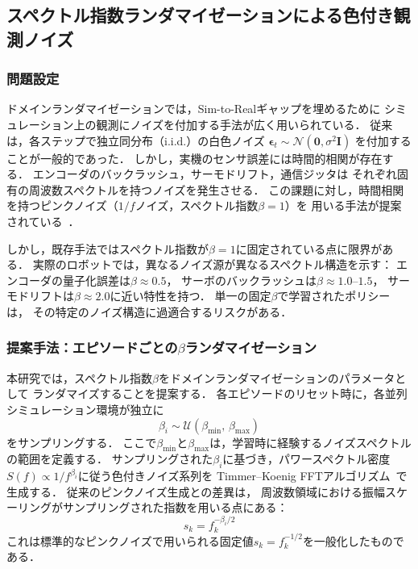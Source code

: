 %

\subsection{スペクトル指数ランダマイゼーションによる色付き観測ノイズ}
\label{sec:colored_obs_noise}

\subsubsection{問題設定}

ドメインランダマイゼーションでは，Sim-to-Realギャップを埋めるために
シミュレーション上の観測にノイズを付加する手法が広く用いられている．
従来は，各ステップで独立同分布（i.i.d.）の白色ノイズ
$\boldsymbol{\epsilon}_t \sim \mathcal{N}(\boldsymbol{0}, \sigma^2 \boldsymbol{I})$
を付加することが一般的であった．
しかし，実機のセンサ誤差には時間的相関が存在する．
エンコーダのバックラッシュ，サーモドリフト，通信ジッタは
それぞれ固有の周波数スペクトルを持つノイズを発生させる．
この課題に対し，時間相関を持つピンクノイズ（$1/f$ノイズ，スペクトル指数$\beta=1$）を
用いる手法が提案されている~\cite{eberhard2023pink}．

しかし，既存手法ではスペクトル指数が$\beta = 1$に固定されている点に限界がある．
実際のロボットでは，異なるノイズ源が異なるスペクトル構造を示す：
エンコーダの量子化誤差は$\beta \approx 0.5$，
サーボのバックラッシュは$\beta \approx 1.0$--$1.5$，
サーモドリフトは$\beta \approx 2.0$に近い特性を持つ．
単一の固定$\beta$で学習されたポリシーは，
その特定のノイズ構造に過適合するリスクがある．

\subsubsection{提案手法：エピソードごとの$\beta$ランダマイゼーション}

本研究では，スペクトル指数$\beta$をドメインランダマイゼーションのパラメータとして
ランダマイズすることを提案する．
各エピソードのリセット時に，各並列シミュレーション環境が独立に
\begin{equation}
  \beta_i \sim \mathcal{U}(\beta_{\min},\, \beta_{\max})
  \label{eq:beta_sample}
\end{equation}
をサンプリングする．
ここで$\beta_{\min}$と$\beta_{\max}$は，学習時に経験するノイズスペクトルの範囲を定義する．
サンプリングされた$\beta_i$に基づき，パワースペクトル密度
$S(f) \propto 1/f^{\beta_i}$に従う色付きノイズ系列を
Timmer--Koenig FFTアルゴリズム~\cite{timmer1995}で生成する．
従来のピンクノイズ生成との差異は，
周波数領域における振幅スケーリングがサンプリングされた指数を用いる点にある：
\begin{equation}
  s_k = f_k^{-\beta_i / 2}
  \label{eq:scaling}
\end{equation}
これは標準的なピンクノイズで用いられる固定値$s_k = f_k^{-1/2}$を一般化したものである．

